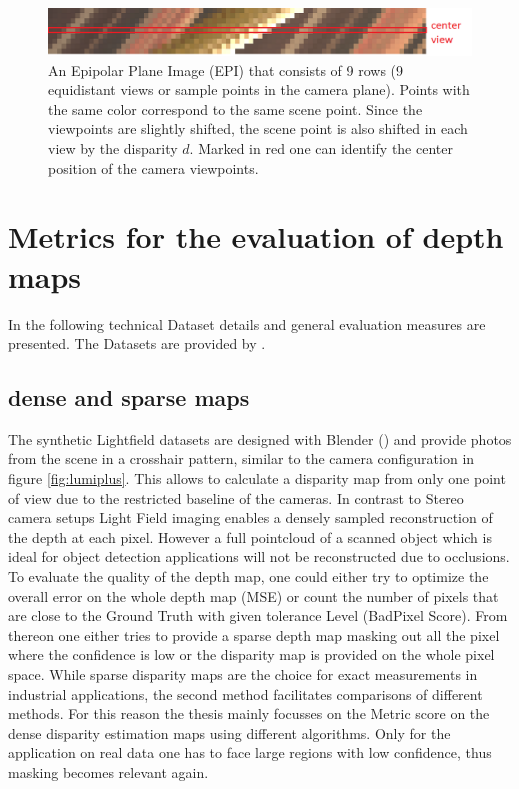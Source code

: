 \documentclass  [
  paper    = a4,
  BCOR     = 10mm,
  twoside,
  fontsize = 12pt,
  fleqn,
  toc      = bibnumbered,
  toc      = listofnumbered,
  numbers  = noendperiod,
  headings = normal,
  listof   = leveldown,
  version  = 3.03
]                                       {scrreprt}
\begin{document}
\begin{figure}
	\centering
	\includegraphics[width=1\linewidth]{images/simple_epi}
	\caption[Example Epipolar Plane image]{An Epipolar Plane Image (EPI) that consists of 9 rows (9 equidistant views or sample points in the camera plane). Points with the same color correspond to the same scene point. Since the viewpoints are slightly shifted, the scene point is also shifted in each view by the disparity $d$. Marked in red one can identify the center position of the camera viewpoints.}
	\label{fig:simpleepi}
\end{figure}
\section{Metrics for the evaluation of depth maps}
In the following technical Dataset details and general evaluation measures are presented. The Datasets are provided by \cite{honauer2016benchmark}.
\subsection{dense and sparse maps}
The synthetic Lightfield datasets are designed with Blender (\cite{blender2014blender}) and provide photos from the scene in a crosshair pattern, similar to the camera configuration in figure \ref{fig:lumiplus}. This allows to calculate a disparity map from only one point of view due to the restricted baseline of the cameras. In contrast to Stereo camera setups Light Field imaging enables a densely sampled reconstruction of the depth at each pixel. However a full pointcloud of a scanned object  which is ideal for object detection applications will not be reconstructed due to occlusions. To evaluate the quality of the depth map, one could either try to optimize the overall error on the whole depth map (MSE) or count the number of pixels that are close to the Ground Truth with given tolerance Level (BadPixel Score). From thereon one either tries to provide a sparse depth map masking out all the pixel where the confidence is low or the disparity map is provided on the whole pixel space. While sparse disparity maps are the choice for exact measurements in industrial applications, the second method facilitates comparisons of different methods. For this reason the thesis mainly focusses on the Metric score on the dense disparity estimation maps using different algorithms. Only for the application on real data one has to face large regions with low confidence, thus masking becomes relevant again.
\end{document}

